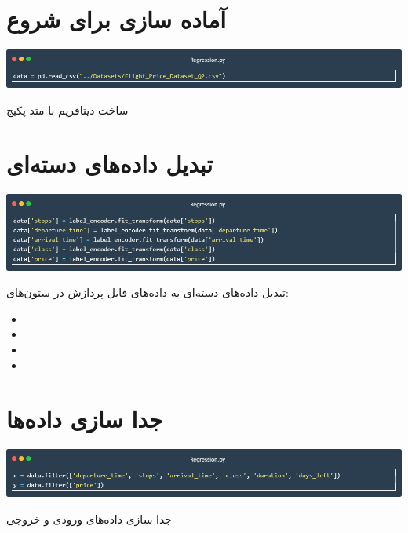 \documentclass[12pt, dvipsnames, svgnames, x11names,]{article}
\begin{document}
				
	
	\section{آماده سازی برای شروع}
	
		{\includegraphics[width=14cm]{images/code01}} \par
		{\normalsize
		 	ساخت دیتافریم با متد  پکیج 
		}
	
	
	\section{تبدیل داده‌های دسته‌ای}
	
		{\includegraphics[width=14cm]{images/code02}} \par
		{\normalsize
			تبدیل داده‌های دسته‌ای به داده‌های قابل پردازش در ستون‌های:
		} \par
		\begin{itemize}
			
			\item 
			{\normalsize {}}
			
			\item 
			{\normalsize {}}
			
			\item 
			{\normalsize {}}
			
			\item 
			{\normalsize {}}

			
		\end{itemize}
	
	
	
	\section{جدا سازی داده‌ها}
	
		\includegraphics[width=14cm]{images/code03} \par
		{\normalsize 
			جدا سازی داده‌های ورودی و خروجی
		}
		
\end{document}
